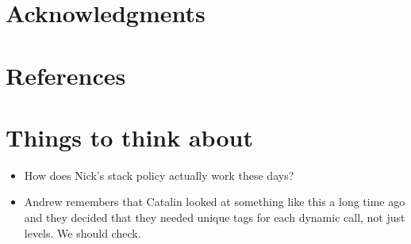 \documentclass[conference]{IEEEtran}
\begin{document}
\section*{Acknowledgments}
\fi

\section*{References}

% 

\newpage

\section*{Things to think about}

\begin{itemize}
\item
How does Nick’s stack policy actually work these days?
\item Andrew remembers that Catalin looked at something like this a long time ago and they decided that they needed unique tags for each dynamic call, not just levels.  We should check.
\end{itemize}
\end{document}
